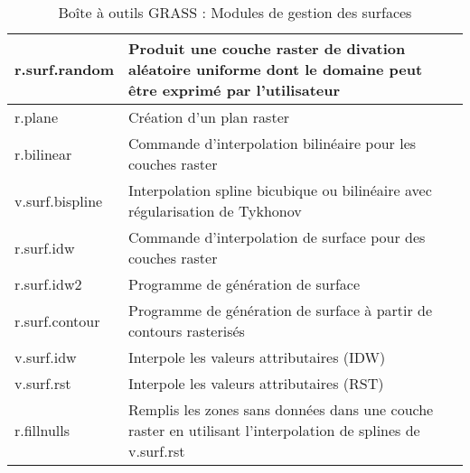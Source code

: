 \begin{table}[H]
\begin{tabular}{|p{4cm}|p{10cm}|}
  \hline r.surf.random & Produit une couche raster de divation aléatoire uniforme dont le domaine peut \^etre exprimé par l'utilisateur\\
  \hline r.plane & Création d'un plan raster \\  
  \hline r.bilinear & Commande d'interpolation bilinéaire pour les couches raster \\
  \hline v.surf.bispline & Interpolation spline bicubique ou bilinéaire avec régularisation de Tykhonov \\
  \hline r.surf.idw & Commande d'interpolation de surface pour des couches raster\\
  \hline r.surf.idw2 & Programme de génération de surface\\
  \hline r.surf.contour & Programme de génération de surface à partir de contours rasterisés \\
  \hline v.surf.idw & Interpole les valeurs attributaires (IDW) \\
  \hline v.surf.rst & Interpole les valeurs attributaires (RST) \\
  \hline r.fillnulls & Remplis les zones sans données dans une couche raster en utilisant l'interpolation de splines de v.surf.rst \\
\hline
\end{tabular}
\caption{Boîte à outils GRASS : Modules de gestion des surfaces}
\end{table}

